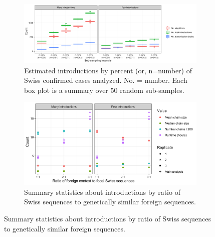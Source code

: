 \documentclass[9pt,twoside,lineno]{pnas-new}
\begin{document}
\begin{figure}[H]
\centering
\begin{subfigure}[b]{\textwidth}
\centering
\includegraphics[width = 11.4cm]{figures/fig_SX_sensitivity_subsampling.png}
\caption{Estimated introductions by percent (or, n=number) of Swiss confirmed cases analyzed. No. = number. Each box plot is a summary over 50 random sub-samples.}  
\end{subfigure}
\label{fig:sensitivity_downsampling}

\begin{subfigure}[b]{0.95\textwidth}
\centering
\includegraphics[width = 11.4cm]{figures/fig_SX_sensitivity_context_set_size.png}
\caption{Summary statistics about introductions by ratio of Swiss sequences to genetically similar foreign sequences.}  
\end{subfigure}
\label{fig:sensitivity_context_set_size}


\end{figure}
\end{document}
